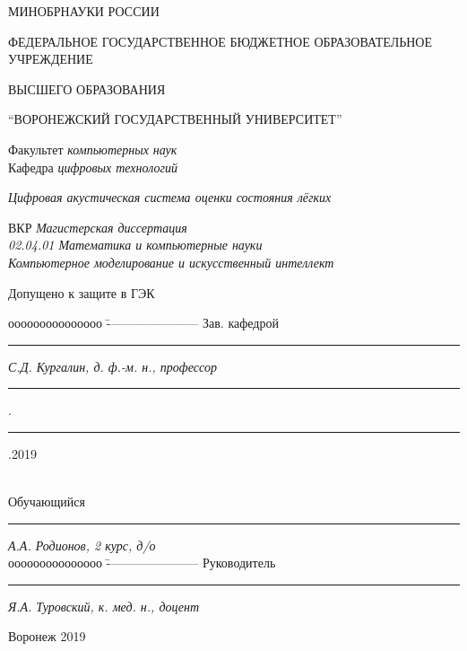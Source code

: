 \documentclass[../main.tex]{subfiles}
\begin{document}
\begin{spacing}{1.2}
{
\sffamily 
\begin{small}
\thispagestyle{empty}
\center
\begin{singlespace}
МИНОБРНАУКИ РОССИИ\\
\begin{bfseries}
ФЕДЕРАЛЬНОЕ ГОСУДАРСТВЕННОЕ БЮДЖЕТНОЕ ОБРАЗОВАТЕЛЬНОЕ УЧРЕЖДЕНИЕ

ВЫСШЕГО ОБРАЗОВАНИЯ

``ВОРОНЕЖСКИЙ ГОСУДАРСТВЕННЫЙ УНИВЕРСИТЕТ''
\end{bfseries}
\end{singlespace}

\vspace{0.5cm}
{Факультет \textit{компьютерных наук}}\\
{Кафедра \textit{цифровых технологий}}\\

\vspace{1.5cm}

\textit{Цифровая акустическая система оценки состояния лёгких}\\

\vspace{1.5cm}

{ВКР} \textit{Магистерская диссертация}\\
\textit{02.04.01 Математика и компьютерные науки}\\
\textit{Компьютерное моделирование и искусственный интеллект}\\

\vspace{3cm}
\begin{flushleft}
{Допущено к защите в ГЭК}
\end{flushleft}
\begin{tabbing}
ооооооооооооооо	\=	----------------------	\kill
Зав. кафедрой\> 	\rule[0mm]{3cm}{0,3mm}	\textit{С.Д. Кургалин, д. ф.-м. н., профессор}{ \rule[0mm]{5mm}{0,3mm}.\rule[0mm]{5mm}{0,3mm}.2019}  \\
Обучающийся \> 	\rule[0mm]{3cm}{0,3mm}	\textit{А.А. Родионов, 2 курс, д/о} \\ 
ооооооооооооооо	\=	----------------------	\kill
Руководитель\> 	\rule[0mm]{3cm}{0,3mm}  \textit{Я.А. Туровский, к. мед. н., доцент }
\end{tabbing}

\vspace{4cm}

\centerline{Воронеж 2019}
\end{small}
}
\end{spacing}
\newpage
\end{document}
